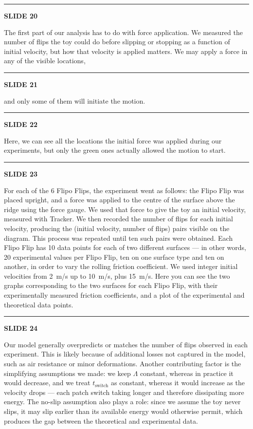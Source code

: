\documentclass[a4paper,11pt]{article}
\newcommand{\slidetitle}[1]{{\small\textbf{SLIDE #1}}\par\smallskip}
\newcommand{\slidedivider}{\vspace{0.7em}\noindent\rule{\textwidth}{0.4pt}\vspace{0.7em}}
\begin{document}
\slidedivider

\slidetitle{20}
The first part of our analysis has to do with force application. We measured the number of flips the toy could do before slipping or stopping as a function of initial velocity, but how that velocity is applied matters. We may apply a force in any of the visible locations,

\slidedivider

\slidetitle{21}
and only some of them will initiate the motion.

\slidedivider

\slidetitle{22}
Here, we can see all the locations the initial force was applied during our experiments, but only the green ones actually allowed the motion to start.

\slidedivider

\slidetitle{23}
For each of the 6 Flipo Flips, the experiment went as follows: the Flipo Flip was placed upright, and a force was applied to the centre of the surface above the ridge using the force gauge. We used that force to give the toy an initial velocity, measured with Tracker. We then recorded the number of flips for each initial velocity, producing the (initial velocity, number of flips) pairs visible on the diagram. This process was repeated until ten such pairs were obtained. Each Flipo Flip has 10 data points for each of two different surfaces --- in other words, 20 experimental values per Flipo Flip, ten on one surface type and ten on another, in order to vary the rolling friction coefficient. We used integer initial velocities from 2~m/s up to 10~m/s, plus 15~m/s. Here you can see the two graphs corresponding to the two surfaces for each Flipo Flip, with their experimentally measured friction coefficients, and a plot of the experimental and theoretical data points.

\slidedivider

\slidetitle{24}
Our model generally overpredicts or matches the number of flips observed in each experiment. This is likely because of additional losses not captured in the model, such as air resistance or minor deformations. Another contributing factor is the simplifying assumptions we made: we keep $\Lambda$ constant, whereas in practice it would decrease, and we treat $t_{\mathrm{switch}}$ as constant, whereas it would increase as the velocity drops --- each patch switch taking longer and therefore dissipating more energy. The no-slip assumption also plays a role: since we assume the toy never slips, it may slip earlier than its available energy would otherwise permit, which produces the gap between the theoretical and experimental data.
\end{document}
